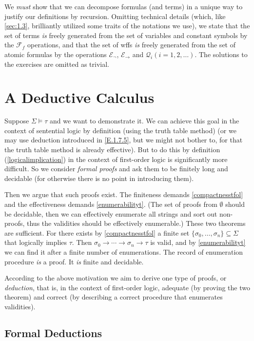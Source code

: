 We \textit{must} show that we can decompose formulas (and terms) in a unique way to justify our definitions by recursion. Omitting technical details (which, like \ref{sec:1.3}, brilliantly utilized some traits of the notations we use), we state that the set of terms \textit{is} freely generated from the set of variables and constant symbols by the $\mathcal{F}_f$ operations, and that the set of wffs \textit{is} freely generated from the set of atomic formulas by the operations $\mathcal{E}_{\neg}$, $\mathcal{E}_{\rightarrow}$ and $\mathcal{Q}_i(i=1,2,\dots).$ The solutions to the exercises are omitted as trivial.

\section{A Deductive Calculus}

Suppose $\Sigma\vDash \tau$ and we want to demonstrate it. We can achieve this goal in the context of sentential logic by definition (using the truth table method) (or we may use deduction introduced in \ref{E.1.7.5}, but we might not bother to, for that the truth table method is already effective). But to do this by definition (\ref{logicalimplication}) in the context of first-order logic is significantly more difficult. So we consider \textit{formal proofs} and ask them to be finitely long and decidable (for otherwise there is no point in introducing them).

Then we argue that such proofs exist. The finiteness demands \ref{compactnesstfol} and the effectiveness demands \ref{enumerabilityt}. (The set of proofs from $\emptyset$ should be decidable, then we can effectively enumerate all strings and sort out non-proofs, thus the validities should be effectively enumerable.) These two theorems are sufficient. For there exists by \ref{compactnesstfol} a finite set $\{\sigma_0,\dots,\sigma_n\}\subseteq \Sigma$ that logically implies $\tau$. Then $\sigma_0\rightarrow\cdots\rightarrow \sigma_n\rightarrow \tau$ is valid, and by \ref{enumerabilityt} we can find it after a finite number of enumerations. The record of enumeration procedure \textit{is} a proof. It \textit{is} finite and decidable.

According to the above motivation we aim to derive one type of proofs, or \textit{deduction}, that is, in the context of first-order logic, adequate (by proving the two theorem) and correct (by describing a correct procedure that enumerates validities).

\subsection*{Formal Deductions}

